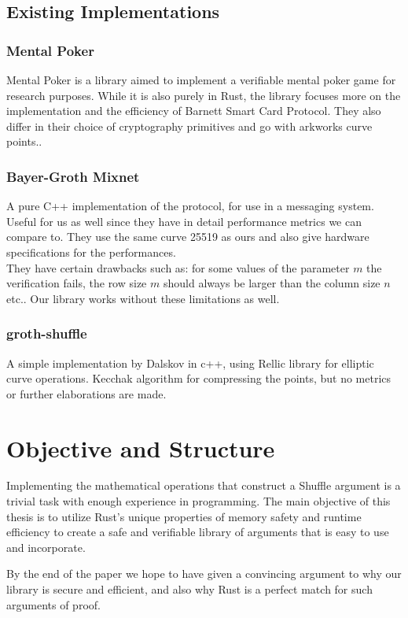 \documentclass[12pt,a4paper]{report}
\begin{document}
\section{Existing Implementations}
\subsection*{Mental Poker}
Mental Poker\cite{mentalpoker} is a library aimed to implement a verifiable
mental poker game for research purposes. While it is also purely in Rust,
the library focuses more on the implementation and the efficiency of 
Barnett Smart Card Protocol\cite{Barnett}. They also differ in their choice
of cryptography primitives and go with arkworks curve points.\cite{arkworks}. 
\subsection*{Bayer-Groth Mixnet}
A pure C++ implementation\cite{bgmixnet} of the protocol, for use in a messaging system.
Useful for us as well since they have in detail performance metrics we can
compare to. They use the same curve 25519 as ours and also give hardware specifications for the performances.\\
They have certain drawbacks such as: for some values of the parameter $m$ the 
verification fails, the row size $m$ should always be larger than the column size $n$ etc.. 
Our library works without these limitations as well.
\subsection*{groth-shuffle}
A simple implementation by Dalskov \cite{andshuf} in c++, using Rellic library for elliptic curve operations.
Kecchak algorithm for compressing the points, but no metrics or further elaborations are made.

\chapter{Objective and Structure}
Implementing the mathematical operations that construct a Shuffle argument is a trivial task with enough experience in programming. The main objective of this thesis is to utilize Rust's unique properties of memory safety and runtime efficiency to create a safe and verifiable library of arguments that is easy to use and incorporate.\par
By the end of the paper we hope to have given a convincing argument to why our library is secure and efficient, and also why Rust is a perfect match for such arguments of proof.
\end{document}
